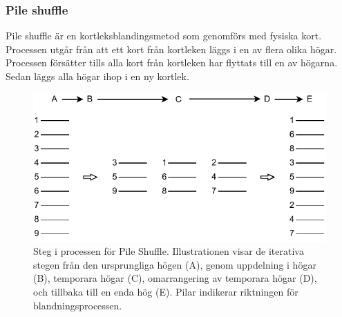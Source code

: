 \documentclass[swedish,a4paper]{article}
\begin{document}

\subsubsection{Pile shuffle}
\label{sec:pile_shuffle}
Pile shuffle är en kortleksblandingsmetod som genomförs med fysiska
kort. Processen utgår från att ett kort
från kortleken läggs i en av flera olika högar. Processen försätter
tills alla kort från kortleken har flyttats till en av högarna. Sedan
läggs  alla högar ihop i en ny kortlek. 


\begin{figure}[H]
	\begin{center}
		\includegraphics{images/pile_shuffle.pdf}
	\end{center}
	\captionsetup{justification=centering,margin=4cm}
	\caption{Steg i processen för Pile Shuffle. Illustrationen visar de
	iterativa stegen från den ursprungliga högen (A), genom uppdelning i
	högar (B), temporara högar (C), omarrangering av temporara högar (D),
	och tillbaka till en enda hög (E). Pilar indikerar riktningen för
	blandningsprocessen.
	}
	\label{fig:pile_shuffle_1}
\end{figure}
\end{document}
